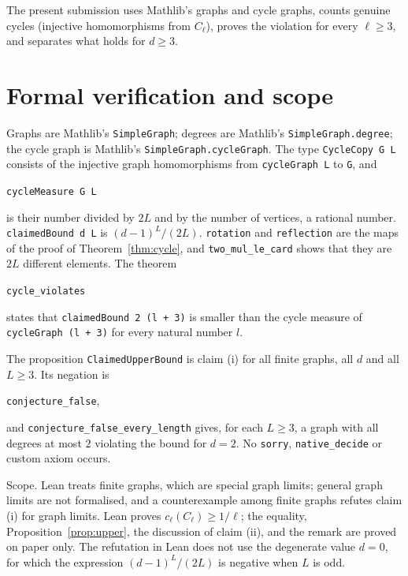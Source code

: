 \documentclass[11pt]{article}
\theoremstyle{remark}
\begin{document}
The present submission uses Mathlib's graphs and cycle graphs, counts
genuine cycles (injective homomorphisms from $C_\ell$), proves the
violation for every $\ell\ge3$, and separates what holds for $d\ge3$.

\section*{Formal verification and scope}
Graphs are Mathlib's \texttt{SimpleGraph}; degrees are Mathlib's
\texttt{SimpleGraph.degree}; the cycle graph is Mathlib's
\texttt{SimpleGraph.cycleGraph}. The type \texttt{CycleCopy G L}
consists of the injective graph homomorphisms from
\texttt{cycleGraph L} to \texttt{G}, and
\begin{center}\small
\texttt{cycleMeasure G L}
\end{center}
is their number divided by $2L$ and by the number of vertices, a
rational number. \texttt{claimedBound d L} is $(d-1)^L/(2L)$.
\texttt{rotation} and \texttt{reflection} are the maps of the proof of
Theorem~\ref{thm:cycle}, and \texttt{two\_mul\_le\_card} shows that
they are $2L$ different elements. The theorem
\begin{center}\small
\texttt{cycle\_violates}
\end{center}
states that \texttt{claimedBound 2 (l + 3)} is smaller than the cycle
measure of \texttt{cycleGraph (l + 3)} for every natural number $l$.

The proposition \texttt{ClaimedUpperBound} is claim (i) for all finite
graphs, all $d$ and all $L\ge3$. Its negation is
\begin{center}\small\texttt{conjecture\_false},\end{center}
and \texttt{conjecture\_false\_every\_length} gives, for each $L\ge3$,
a graph with all degrees at most $2$ violating the bound for $d=2$. No
\texttt{sorry}, \texttt{native\_decide} or custom axiom occurs.

Scope. Lean treats finite graphs, which are special graph limits;
general graph limits are not formalised, and a counterexample among
finite graphs refutes claim (i) for graph limits. Lean proves
$c_\ell(C_\ell)\ge1/\ell$; the equality, Proposition~\ref{prop:upper},
the discussion of claim (ii), and the remark are proved on paper only.
The refutation in Lean does not use the degenerate value $d=0$, for
which the expression $(d-1)^L/(2L)$ is negative when $L$ is odd.
\end{document}
